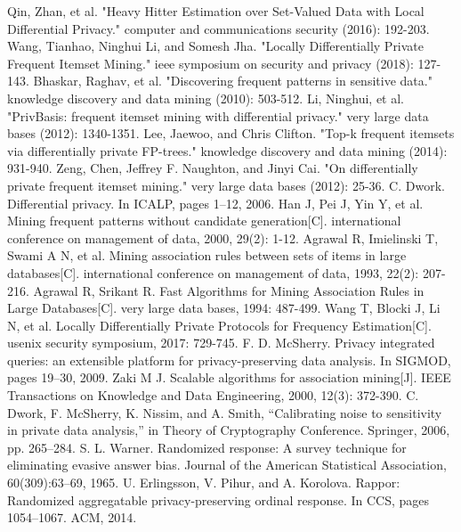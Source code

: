 \documentclass[conference]{IEEEtran}
\begin{document}
\begin{thebibliography}{00}
 Qin, Zhan, et al. "Heavy Hitter Estimation over Set-Valued Data with Local Differential Privacy." computer and communications security (2016): 192-203.
 Wang, Tianhao, Ninghui Li, and Somesh Jha. "Locally Differentially Private Frequent Itemset Mining." ieee symposium on security and privacy (2018): 127-143.
 Bhaskar, Raghav, et al. "Discovering frequent patterns in sensitive data." knowledge discovery and data mining (2010): 503-512.
 Li, Ninghui, et al. "PrivBasis: frequent itemset mining with differential privacy." very large data bases (2012): 1340-1351.
 Lee, Jaewoo, and Chris Clifton. "Top-k frequent itemsets via differentially private FP-trees." knowledge discovery and data mining (2014): 931-940.
 Zeng, Chen, Jeffrey F. Naughton, and Jinyi Cai. "On differentially private frequent itemset mining." very large data bases (2012): 25-36.
 C. Dwork. Differential privacy. In ICALP, pages 1–12, 2006.
 Han J, Pei J, Yin Y, et al. Mining frequent patterns without candidate generation[C]. international conference on management of data, 2000, 29(2): 1-12.
 Agrawal R, Imielinski T, Swami A N, et al. Mining association rules between sets of items in large databases[C]. international conference on management of data, 1993, 22(2): 207-216.
 Agrawal R, Srikant R. Fast Algorithms for Mining Association Rules in Large Databases[C]. very large data bases, 1994: 487-499.
 Wang T, Blocki J, Li N, et al. Locally Differentially Private Protocols for Frequency Estimation[C]. usenix security symposium, 2017: 729-745.
 F. D. McSherry. Privacy integrated queries: an extensible platform for privacy-preserving data
analysis. In SIGMOD, pages 19–30, 2009.
 Zaki M J. Scalable algorithms for association mining[J]. IEEE Transactions on Knowledge and Data Engineering, 2000, 12(3): 372-390.
 C. Dwork, F. McSherry, K. Nissim, and A. Smith, “Calibrating noise to sensitivity in private data analysis,” in Theory of Cryptography Conference. Springer, 2006, pp. 265–284.
 S. L. Warner. Randomized response: A survey technique for eliminating evasive answer bias. Journal of the American Statistical Association, 60(309):63–69, 1965.
 U. Erlingsson, V. Pihur, and A. Korolova. Rappor: Randomized aggregatable privacy-preserving ordinal response. In CCS, pages 1054–1067. ACM, 2014.



\end{thebibliography}
\end{document}
